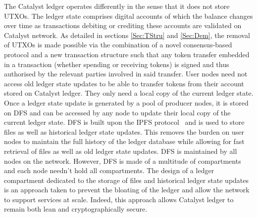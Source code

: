 The Catalyst ledger operates differently in the sense that it does not store UTXOs. The ledger state comprises digital accounts of which the balance changes over time as transactions debiting or crediting these accounts are validated on Catalyst network. As detailed in sections \ref{Sec:TStru} and \ref{Sec:Dem}, the removal of UTXOs is made possible via the combination of a novel consensus-based protocol and a new transaction structure such that any token transfer embedded in a transaction (whether spending or receiving tokens) is signed and thus authorised by the relevant parties involved in said transfer. User nodes need not access old ledger state updates to be able to transfer tokens from their account stored on Catalyst ledger. They only need a local copy of the current ledger state.\\

Once a ledger state update is generated by a pool of producer nodes, it is stored on DFS and can be accessed by any node to update their local copy of the current ledger state. DFS is built upon the IPFS protocol~\cite{ipfs} and is used to store files as well as historical ledger state updates. This removes the burden on user nodes to maintain the full history of the ledger database while allowing for fast retrieval of files as well as old ledger state updates. DFS is maintained by all nodes on the network. However, DFS is made of a multitude of compartments and each node needn’t hold all compartments. The design of a ledger compartment dedicated to the storage of files and historical ledger state updates is an approach taken to prevent the bloating of the ledger and allow the network to support services at scale. Indeed, this approach allows Catalyst ledger to remain both lean and cryptographically secure.
